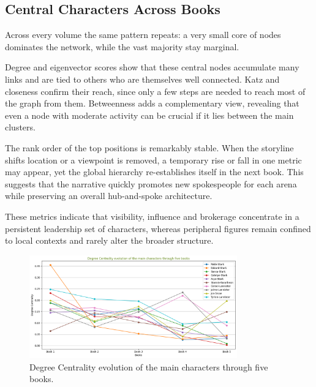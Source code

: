 \documentclass[12pt, a4paper]{article}
\begin{document}
\subsection*{Central Characters Across Books}
Across every volume the same pattern repeats: 
a very small core of nodes dominates the network, 
while the vast majority stay marginal.

Degree and eigenvector scores show that these central 
nodes accumulate many links and are tied to others 
who are themselves well connected. Katz and closeness 
confirm their reach, since only a few steps are needed 
to reach most of the graph from them. Betweenness adds 
a complementary view, revealing that even a node with 
moderate activity can be crucial if it lies between the main clusters. 

The rank order of the top positions is remarkably stable. 
When the storyline shifts location or a viewpoint is removed, 
a temporary rise or fall in one metric may appear, yet the global
 hierarchy re-establishes itself in the next book. 
 This suggests that the narrative quickly promotes new spokespeople 
 for each arena while preserving an overall hub-and-spoke architecture.

These metrics indicate that visibility, 
 influence and brokerage concentrate in a persistent 
 leadership set of characters, whereas peripheral figures remain 
 confined to local contexts and rarely alter the broader structure.

\begin{figure}[htbp]
\centering
\includegraphics[width=0.8\textwidth]{deg-cent-evolution.png}
\caption{Degree Centrality evolution of the main characters through five books.}
\label{fig:deg_cent_evolution}
\end{figure}
\end{document}
